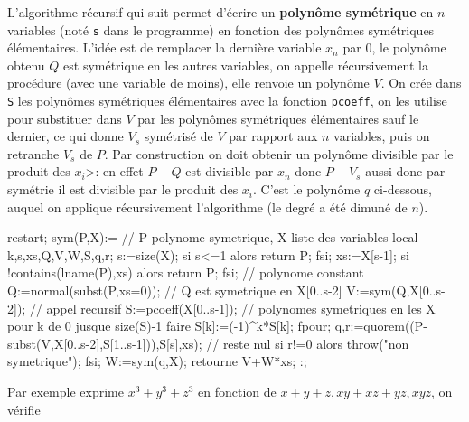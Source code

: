 \documentclass[a4paper,11pt]{book}
\begin{document}
\begin{giacjshere}
L'algorithme r\'ecursif qui suit permet d'\'ecrire un {\bf polyn\^ome
sym\'etrique}
en $n$ variables (not\'e \verb|s| dans le programme)
en fonction des polyn\^omes sym\'etriques \'el\'ementaires. L'id\'ee
est de remplacer la derni\`ere variable $x_n$ par 0, le polyn\^ome
obtenu $Q$ est sym\'etrique en les autres variables, on appelle
r\'ecursivement la proc\'edure (avec une variable de moins),
elle renvoie un polyn\^ome
$V$. On cr\'ee dans \verb|S| les polyn\^omes sym\'etriques
\'el\'ementaires avec la fonction \verb|pcoeff|, on les utilise
pour substituer
dans $V$ par les polyn\^omes sym\'etriques \'el\'ementaires sauf
le dernier, ce qui donne $V_s$ sym\'etris\'e de $V$ par rapport aux
$n$ variables, puis on retranche $V_s$ de $P$. Par construction on doit 
obtenir un polyn\^ome divisible par le produit des $x_i$>: en effet
$P-Q$ est divisible par $x_n$ donc $P-V_s$ aussi donc par sym\'etrie
il est divisible par le produit des $x_i$. C'est le polyn\^ome
$q$ ci-dessous, auquel on applique r\'ecursivement l'algorithme
(le degr\'e a \'et\'e dimun\'e de $n$).
\begin{giacprog}
restart;
sym(P,X):={ // P polynome symetrique, X liste des variables
  local k,s,xs,Q,V,W,S,q,r;
  s:=size(X);
  si s<=1 alors return P; fsi;
  xs:=X[s-1];
  si !contains(lname(P),xs) alors return P; fsi; // polynome constant
  Q:=normal(subst(P,xs=0)); // Q est symetrique en X[0..s-2]
  V:=sym(Q,X[0..s-2]); // appel recursif
  S:=pcoeff(X[0..s-1]); // polynomes symetriques en les X
  pour k de 0 jusque size(S)-1 faire S[k]:=(-1)^k*S[k]; fpour;
  q,r:=quorem((P-subst(V,X[0..s-2],S[1..s-1])),S[s],xs); // reste nul
  si r!=0 alors throw("non symetrique"); fsi;
  W:=sym(q,X);
  retourne V+W*xs;
}:;
\end{giacprog}
Par exemple
exprime $x^3+y^3+z^3$ en fonction de $x+y+z,xy+xz+yz,xyz$,
on v\'erifie 

\pagebreak


\end{giacjshere}
\end{document}

